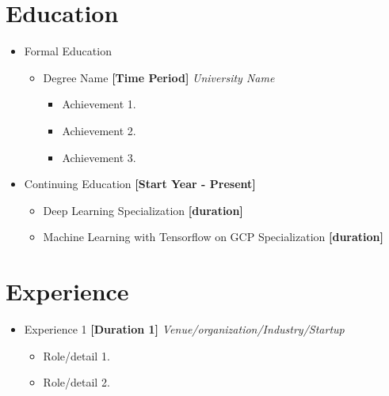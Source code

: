 \documentclass{article}
\begin{document}
    \section{Education}
        \begin{itemize}
            \item Formal Education
                \begin{itemize}
                    \item Degree Name 
                    \textbf{[Time Period]}
                    \newline \textit{University Name}
                        \begin{itemize}
                            \item Achievement 1.
                            \item Achievement 2.
                            \item Achievement 3.
                        \end{itemize}
                \end{itemize}
            \item Continuing Education \textbf{[Start Year - Present]}
                \begin{itemize}
                    \item Deep Learning Specialization \textbf{[duration]}
                    \item Machine Learning with Tensorflow on GCP Specialization \textbf{[duration]}
                \end{itemize}
        \end{itemize}
        
    \section{Experience}
        \begin{itemize}
            \item Experience 1 
            \textbf{[Duration 1]}
            \newline \textit{Venue/organization/Industry/Startup}
                \begin{itemize}
                    \item Role/detail 1.
                    \item Role/detail 2.

                \end{itemize}
        \end{itemize}
    
\end{document}
